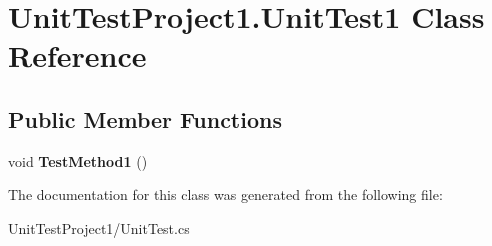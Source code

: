 \hypertarget{class_unit_test_project1_1_1_unit_test1}{}\section{Unit\+Test\+Project1.\+Unit\+Test1 Class Reference}
\label{class_unit_test_project1_1_1_unit_test1}
\subsection*{Public Member Functions}
\begin{DoxyCompactItemize}
\item 
\mbox{\label{class_unit_test_project1_1_1_unit_test1_ab8d78f432b13c60640430a30b20a07fc}} 
void {\bfseries Test\+Method1} ()
\end{DoxyCompactItemize}


The documentation for this class was generated from the following file\+:\begin{DoxyCompactItemize}
\item 
Unit\+Test\+Project1/Unit\+Test.\+cs\end{DoxyCompactItemize}
